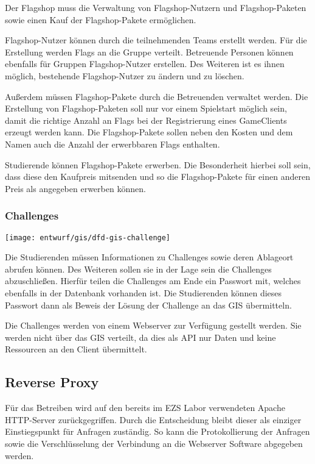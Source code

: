 Der Flagshop muss die Verwaltung von Flagshop-Nutzern und Flagshop-Paketen sowie einen Kauf der Flagshop-Pakete ermöglichen.

Flagshop-Nutzer können durch die teilnehmenden Teams erstellt werden. Für die Erstellung werden Flags an die Gruppe verteilt. Betreuende Personen können ebenfalls für Gruppen Flagshop-Nutzer erstellen. Des Weiteren ist es ihnen möglich, bestehende Flagshop-Nutzer zu ändern und zu löschen.

Außerdem müssen Flagshop-Pakete durch die Betreuenden verwaltet werden. Die Erstellung von Flagshop-Paketen soll nur vor einem Spielstart möglich sein, damit die richtige Anzahl an Flags bei der Registrierung eines GameClients erzeugt werden kann. Die Flagshop-Pakete sollen neben den Kosten und dem Namen auch die Anzahl der erwerbbaren Flags enthalten.

Studierende können Flagshop-Pakete erwerben. Die Besonderheit hierbei soll sein, dass diese den Kaufpreis mitsenden und so die Flagshop-Pakete für einen anderen Preis als angegeben erwerben können.

\subsubsection{Challenges}
\begin{center}
	\texttt{[image: entwurf/gis/dfd-gis-challenge]}
\end{center}

Die Studierenden müssen Informationen zu Challenges sowie deren Ablageort abrufen können. Des Weiteren sollen sie in der Lage sein die Challenges abzuschließen. Hierfür teilen die Challenges am Ende ein Passwort mit, welches ebenfalls in der Datenbank vorhanden ist. Die Studierenden können dieses Passwort dann als Beweis der Lösung der Challenge an das GIS übermitteln.

Die Challenges werden von einem Webserver zur Verfügung gestellt werden. Sie werden nicht über das GIS verteilt, da dies als API nur Daten und keine Ressourcen an den Client übermittelt.

\subsection{Reverse Proxy}
Für das Betreiben wird auf den bereits im EZS Labor verwendeten Apache HTTP-Server zurückgegriffen. Durch die Entscheidung bleibt dieser als einziger Einstiegspunkt für Anfragen zuständig. So kann die Protokollierung der Anfragen sowie die Verschlüsselung der Verbindung an die Webserver Software abgegeben werden.


